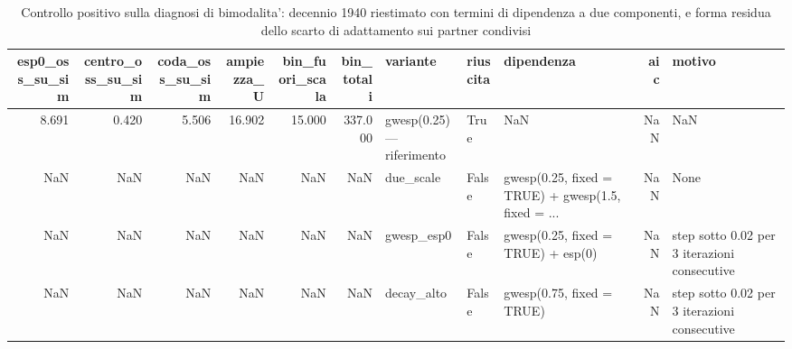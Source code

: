 \begin{table}
\centering
\caption{Controllo positivo sulla diagnosi di bimodalita': decennio 1940 riestimato con termini di dipendenza a due componenti, e forma residua dello scarto di adattamento sui partner condivisi}
\label{tab:t4_bimodale}
\begin{tabular}{rrrrrrlllrl}
\toprule
 esp0\_oss\_su\_sim &  centro\_oss\_su\_sim &  coda\_oss\_su\_sim &  ampiezza\_U &  bin\_fuori\_scala &  bin\_totali &                  variante &  riuscita &                                         dipendenza &  aic &                                       motivo \\
\midrule
           8.691 &              0.420 &            5.506 &      16.902 &           15.000 &     337.000 & gwesp(0.25) — riferimento &      True &                                                NaN &  NaN &                                          NaN \\
             NaN &                NaN &              NaN &         NaN &              NaN &         NaN &                 due\_scale &     False & gwesp(0.25, fixed = TRUE) + gwesp(1.5, fixed = ... &  NaN &                                         None \\
             NaN &                NaN &              NaN &         NaN &              NaN &         NaN &                gwesp\_esp0 &     False &                 gwesp(0.25, fixed = TRUE) + esp(0) &  NaN & step sotto 0.02 per 3 iterazioni consecutive \\
             NaN &                NaN &              NaN &         NaN &              NaN &         NaN &                decay\_alto &     False &                          gwesp(0.75, fixed = TRUE) &  NaN & step sotto 0.02 per 3 iterazioni consecutive \\
\bottomrule
\end{tabular}
\end{table}
